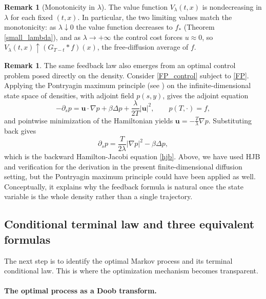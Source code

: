 \documentclass[11pt]{amsart}
\renewcommand{\Vert}{|}
\numberwithin{equation}{section}
\numberwithin{figure}{section}
\theoremstyle{definition}\newtheorem{remark}[theorem]{Remark}%
\begin{document}
\begin{remark}[Monotonicity in $\lambda$]\label{monotonicity_lambda}
The value function $V_\lambda(t,x)$ is nondecreasing in $\lambda$ for each fixed $(t,x)$. 
In particular, the two limiting values match the monotonicity: as $\lambda \downarrow 0$ the value function decreases to $f_*$ (Theorem \ref{small_lambda}), and as $\lambda \to +\infty$ the control cost forces $u \approx 0$, so $V_\lambda(t,x) \uparrow (G_{T-t} * f)(x)$, the free-diffusion average of $f$.
\end{remark}


\begin{remark}\label{pmp_remark}
The same feedback law also emerges from an optimal control problem posed directly on the density. Consider \eqref{FP_control} subject to \eqref{FP}. Applying the Pontryagin maximum principle (see \cite{LiYong95, TrelatBook}) on the infinite-dimensional state space of densities, with adjoint field $p(s,y)$, gives the adjoint equation
$$
- \partial_s p = \mathbf u \cdot \nabla p + \beta \Delta p + \frac{\lambda}{2T}\Vert \mathbf u \Vert^2,
\qquad
p(T,\cdot) = f,
$$
and pointwise minimization of the Hamiltonian yields $\mathbf u = - \frac{T}{\lambda}\nabla p$. Substituting back gives
$$
\partial_s p = \frac{T}{2\lambda}\Vert \nabla p \Vert^2 - \beta \Delta p,
$$
which is the backward Hamilton-Jacobi equation \eqref{hjb}. Above, we have used HJB and verification for the derivation in the present finite-dimensional diffusion setting, but the Pontryagin maximum principle could have been applied as well. Conceptually, it explains why the feedback formula is natural once the state variable is the whole density rather than a single trajectory.
\end{remark}

\subsection{Conditional terminal law and three equivalent formulas}

The next step is to identify the optimal Markov process and its terminal conditional law. This is where the optimization mechanism becomes transparent.

\medskip
\paragraph{\bf The optimal process as a Doob transform.}
\end{document}
